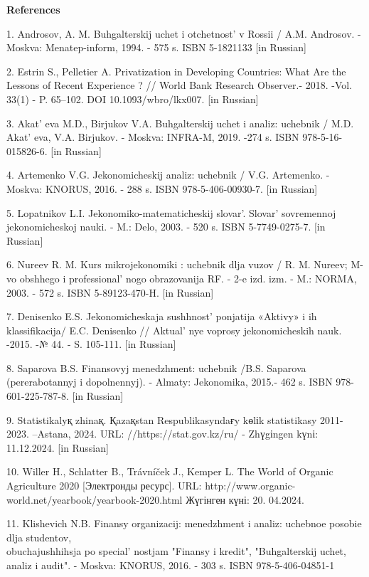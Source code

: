 \begin{center}
{\bfseries References}
\end{center}

\begin{references}
1. Androsov, A. M. Buhgalterskij uchet i otchetnost'{} v
Rossii / A.M. Androsov. -Moskva: Menatep-inform, 1994. - 575 s. ISBN
5-1821133 {[}in Russian{]}

2. Estrin S., Pelletier A. Privatization in Developing Countries: What
Are the Lessons of Recent Experience ? // World Bank Research Observer.-
2018. -Vol. 33(1) - P. 65--102. DOI 10.1093/wbro/lkx007. {[}in Russian{]}

3. Akat' eva M.D., Birjukov V.A. Buhgalterskij uchet i
analiz: uchebnik / M.D. Akat' eva, V.A. Birjukov. -
Moskva: INFRA-M, 2019. -274 s. ISBN 978-5-16-015826-6. {[}in Russian{]}

4. Artemenko V.G. Jekonomicheskij analiz: uchebnik / V.G. Artemenko. -
Moskva: KNORUS, 2016. - 288 s. ISBN 978-5-406-00930-7. {[}in Russian{]}

5. Lopatnikov L.I. Jekonomiko-matematicheskij slovar'.
Slovar'{} sovremennoj jekonomicheskoj nauki. - M.: Delo,
2003. - 520 s. ISBN 5-7749-0275-7. {[}in Russian{]}

6. Nureev R. M. Kurs mikrojekonomiki : uchebnik dlja vuzov / R. M.
Nureev; M-vo obshhego i professional' nogo obrazovanija
RF. - 2-e izd. izm. - M.: NORMA, 2003. - 572 s. ISBN 5-89123-470-H.
{[}in Russian{]}

7. Denisenko E.S. Jekonomicheskaja sushhnost'{} ponjatija
«Aktivy» i ih klassifikacija/ E.C. Denisenko //
Aktual' nye voprosy jekonomicheskih nauk. -2015. -№ 44. -
S. 105-111. {[}in Russian{]}

8. Saparova B.S. Finansovyj menedzhment: uchebnik /B.S. Saparova
(pererabotannyj i dopolnennyj). - Almaty: Jekonomika, 2015.- 462 s. ISBN
978-601-225-787-8. {[}in Russian{]}

9. Statistikalyқ zhinaқ. Қazaқstan Respublikasyndaғy kөlіk statistikasy
2011-2023. --Astana, 2024. URL: //https://stat.gov.kz/ru/ - Zhүgіngen
kүnі: 11.12.2024. {[}in Russian{]}

10. Willer H., Schlatter B., Trávníček J., Kemper L. The World of Organic
Agriculture 2020 {[}Электронды ресурс{]}. URL:
http://www.organic-world.net/yearbook/yearbook-2020.html Жүгінген күні:
20. 04.2024.

11. Klishevich N.B. Finansy organizacij: menedzhment i analiz: uchebnoe
posobie dlja studentov, \\obuchajushhihsja po
special' nostjam "Finansy i kredit", "Buhgalterskij
uchet, analiz i audit". - Moskva: KNORUS, 2016. - 303 s. ISBN
978-5-406-04851-1


\end{references}
